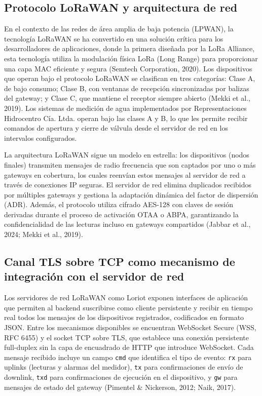 \documentclass[12pt,a4paper,oneside]{report}
\begin{document}
\subsection{Protocolo LoRaWAN y arquitectura de red}\label{protocolo-lorawan-y-arquitectura-de-red}

En el contexto de las redes de área amplia de baja potencia (LPWAN), la tecnología LoRaWAN se ha convertido en una solución crítica para los desarrolladores de aplicaciones, donde la primera diseñada por la LoRa Alliance, esta tecnología utiliza la modulación física LoRa (Long Range) para proporcionar una capa MAC eficiente y segura (Semtech Corporation, 2020). Los dispositivos que operan bajo el protocolo LoRaWAN se clasifican en tres categorías: Clase A, de bajo consumo; Clase B, con ventanas de recepción sincronizadas por balizas del gateway; y Clase C, que mantiene el receptor siempre abierto (Mekki et al., 2019). Los sistemas de medición de agua implementados por Representaciones Hidrocentro Cía. Ltda. operan bajo las clases A y B, lo que les permite recibir comandos de apertura y cierre de válvula desde el servidor de red en los intervalos configurados.

La arquitectura LoRaWAN sigue un modelo en estrella: los dispositivos (nodos finales) transmiten mensajes de radio frecuencia que son captados por uno o más gateways en cobertura, los cuales reenvían estos mensajes al servidor de red a través de conexiones IP seguras. El servidor de red elimina duplicados recibidos por múltiples gateways y gestiona la adaptación dinámica del factor de dispersión (ADR). Además, el protocolo utiliza cifrado AES-128 con claves de sesión derivadas durante el proceso de activación OTAA o ABPA, garantizando la confidencialidad de las lecturas incluso en gateways compartidos (Jabbar et al., 2024; Mekki et al., 2019).

\subsection{Canal TLS sobre TCP como mecanismo de integración con el servidor de red}\label{canal-tls-integracion}

Los servidores de red LoRaWAN como Loriot exponen interfaces de aplicación que permiten al backend suscribirse como cliente persistente y recibir en tiempo real todos los mensajes de los dispositivos registrados, codificados en formato JSON. Entre los mecanismos disponibles se encuentran WebSocket Secure (WSS, RFC 6455) y el socket TCP sobre TLS, que establece una conexión persistente full-duplex sin la capa de encuadrado de HTTP que introduce WebSocket. Cada mensaje recibido incluye un campo \texttt{cmd} que identifica el tipo de evento: \texttt{rx} para uplinks (lecturas y alarmas del medidor), \texttt{tx} para confirmaciones de envío de downlink, \texttt{txd} para confirmaciones de ejecución en el dispositivo, y \texttt{gw} para mensajes de estado del gateway (Pimentel \& Nickerson, 2012; Naik, 2017).
\end{document}
